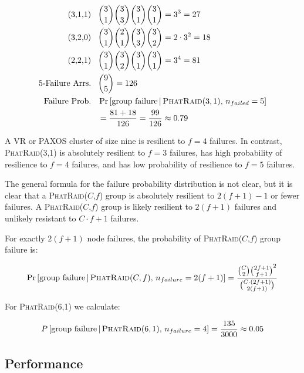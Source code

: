 \documentclass[10pt,letter]{article}
\newcommand{\phatraidcf}[2]{\textsc{PhatRaid}(#1,#2)}
\begin{document}
\begin{align*}
  \textrm{(3,1,1)}\;\;\;
    &\binom{3}{1}\binom{3}{3}\binom{3}{1}\binom{3}{1} = 3^3 = 27 \\
  \textrm{(3,2,0)}\;\;\;
    &\binom{3}{1}\binom{2}{1}\binom{3}{3}\binom{3}{2} = 2\cdot3^2 = 18 \\
  \textrm{(2,2,1)}\;\;\;
    &\binom{3}{1}\binom{3}{2}\binom{3}{1}\binom{3}{1} = 3^4 = 81 \\
  \textrm{5-Failure Arrs.}\;\;\;
    &\binom{9}{5} = 126 \\
  \textrm{Failure Prob.}\;\;\;
    &\Pr\left[\textrm{group failure} \,|\, \phatraidcf{3}{1},\, n_{failed} = 5\right] \\
    &= \frac{81 + 18}{126} = \frac{99}{126} \approx 0.79 \\
\end{align*}

A VR or PAXOS cluster of size nine is resilient to $f = 4$ failures. In
contrast, \phatraidcf{3}{1} is absolutely resilient to $f=3$ failures, has high
probability of resilience to $f=4$ failures, and has low probability of
resilience to $f=5$ failures.

The general formula for the failure probability distribution is not clear, but
it is clear that a \phatraidcf{$C$}{$f$} group is absolutely resilient to $2(f +
1) - 1$ or fewer failures. A \phatraidcf{$C$}{$f$} group is likely resilient
to $2(f+1)$ failures and unlikely resistant to $C\cdot f + 1$ failures.

For exactly $2(f+1)$ node failures, the probability of \phatraidcf{$C$}{$f$}
group failure is:

\begin{align*}
  \Pr\left[\textrm{group failure} \,|\, \phatraidcf{C}{f},\, n_{failure}=2(f+1)\right]
    =
  \frac{\binom{C}{2}\binom{2f+1}{f+1}^2}
       {\binom{C \cdot (2f+1)}{2(f+1)}}
\end{align*}

For \phatraidcf{6}{1} we calculate:

\begin{align*}
  P\left[\textrm{group failure} \,|\, \phatraidcf{6}{1},\, n_{failure}=4\right]
    = \frac{135}{3000} \approx 0.05
\end{align*}

\subsection{Performance}
\end{document}
